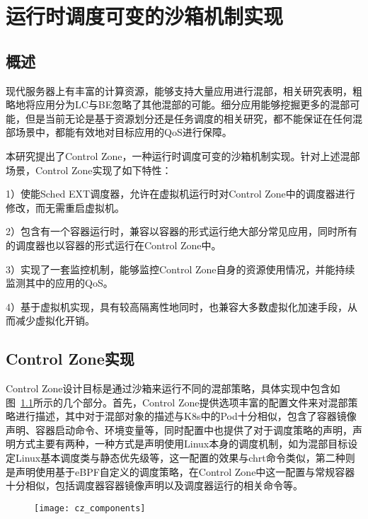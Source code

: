 \chapter{运行时调度可变的沙箱机制实现}\label{chap:control_zone}

\section{概述}


现代服务器上有丰富的计算资源，能够支持大量应用进行混部，相关研究表明，粗略地将应用分为LC与BE忽略了其他混部的可能。细分应用能够挖掘更多的混部可能，但是当前无论是基于资源划分还是任务调度的相关研究，都不能保证在任何混部场景中，都能有效地对目标应用的QoS进行保障。

本研究提出了Control Zone，一种运行时调度可变的沙箱机制实现。针对上述混部场景，Control Zone实现了如下特性：

1）使能Sched EXT调度器，允许在虚拟机运行时对Control Zone中的调度器进行修改，而无需重启虚拟机。

2）包含有一个容器运行时，兼容以容器的形式运行绝大部分常见应用，同时所有的调度器也以容器的形式运行在Control Zone中。

3）实现了一套监控机制，能够监控Control Zone自身的资源使用情况，并能持续监测其中的应用的QoS。

4）基于虚拟机实现，具有较高隔离性地同时，也兼容大多数虚拟化加速手段，从而减少虚拟化开销。

\section{Control Zone实现}

Control Zone设计目标是通过沙箱来运行不同的混部策略，具体实现中包含如图~\ref{fig:cz_components}所示的几个部分。首先，Control Zone提供选项丰富的配置文件来对混部策略进行描述，其中对于混部对象的描述与K8s中的Pod十分相似，包含了容器镜像声明、容器启动命令、环境变量等，同时配置中也提供了对于调度策略的声明，声明方式主要有两种，一种方式是声明使用Linux本身的调度机制，如为混部目标设定Linux基本调度类与静态优先级等，这一配置的效果与chrt命令类似，第二种则是声明使用基于eBPF自定义的调度策略，在Control Zone中这一配置与常规容器十分相似，包括调度器容器镜像声明以及调度器运行的相关命令等。

\begin{figure}[!htbp]
    \centering
    \texttt{[image: cz\_components]}
    \label{fig:cz_components}
\end{figure}

